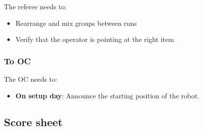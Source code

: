 The referee needs to:
\begin{itemize}[nosep]
	\item Rearrange and mix groups between runs
	\item Verify that the operator is pointing at the right item
\end{itemize}

\subsubsection*{To OC}
The OC needs to:
\begin{itemize}[nosep]
	\item \textbf{On setup day}: Announce the starting position of the robot.
\end{itemize}



\subsection*{Score sheet}



